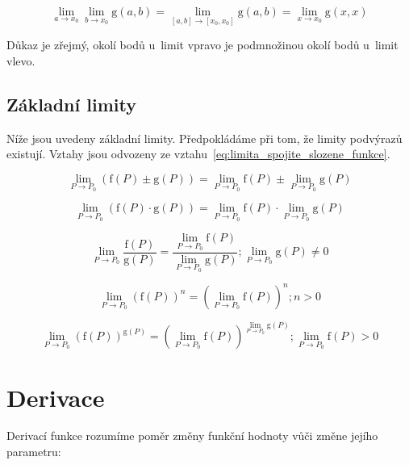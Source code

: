 \begin{equation}
\label{eq:zuzeni_limity_stejne_promenne}
\lim_{a \to x_0} \lim_{b \to x_0} \mathrm{g}(a, b) = \lim_{[a, b] \to [x_0, x_0]} \mathrm{g}(a, b) = \lim_{x \to x_0} \mathrm{g}(x, x)
\end{equation}

Důkaz je zřejmý, okolí bodů u~limit vpravo je podmnožinou okolí bodů u~limit vlevo.

\subsection{Základní limity}

Níže jsou uvedeny základní limity. Předpokládáme při tom, že limity podvýrazů existují. Vztahy jsou odvozeny ze vztahu~\eqref{eq:limita_spojite_slozene_funkce}.

\begin{equation}
\lim_{P \to P_0} \left(\mathrm{f}(P) \pm \mathrm{g}(P) \right) = \lim_{P \to P_0} \mathrm{f}(P) \pm \lim_{P \to P_0} \mathrm{g}(P)
\end{equation}

\begin{equation}
\lim_{P \to P_0} \left(\mathrm{f}(P) \cdot \mathrm{g}(P) \right) = \lim_{P \to P_0} \mathrm{f}(P) \cdot \lim_{P \to P_0} \mathrm{g}(P)
\end{equation}

\begin{equation}
\lim_{P \to P_0} \frac{\mathrm{f}(P)}{\mathrm{g}(P)} = \frac{\lim_{P \to P_0} \mathrm{f}(P)}{\lim_{P \to P_0} \mathrm{g}(P)}; \lim_{P \to P_0} \mathrm{g}(P) \neq 0
\end{equation}

\begin{equation}
\lim_{P \to P_0} \left(\mathrm{f}(P)\right)^n = \left(\lim_{P \to P_0} \mathrm{f}(P)\right)^n; n > 0
\end{equation}

\begin{equation}
\lim_{P \to P_0} \left(\mathrm{f}(P)\right)^{\mathrm{g}(P)} = \left(\lim_{P \to P_0} \mathrm{f}(P)\right)^{\lim_{P \to P_0} \mathrm{g}(P)}; \lim_{P \to P_0} \mathrm{f}(P) > 0
\end{equation}

\section{Derivace}

Derivací funkce rozumíme poměr změny funkční hodnoty vůči změne jejího parametru:

